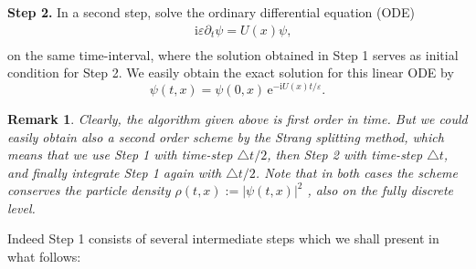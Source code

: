 \documentclass[leqno,final]{siamltex}
\newtheorem{remark}{Remark}[section]
\numberwithin{equation}{section}
\newcounter{me}
\begin{document}
{\par}
\textbf{Step 2.} In a second step, solve the ordinary differential
equation (ODE)
\begin{equation}
\label{bd2}
\begin{aligned}
& \,{\mathrm{i}} {{\varepsilon }} \partial _t\psi  = U(x) \psi, \\
\end{aligned}
\end{equation}
on the same time-interval, where the solution obtained in Step 1
serves as initial condition for Step 2. We easily obtain the exact
solution for this linear ODE by \begin{equation} \label{bd3}
\psi(t,x)=\psi(0,x)\,{\mathrm{e}}^{-{\mathrm{i}} U(x) t/{{\varepsilon }}}. \end{equation}
\begin{remark} \label{rem1}
Clearly, the algorithm given above is first order in time. But we
could easily obtain also a second order scheme by the Strang
splitting method, which means that we use Step 1 with time-step
${\triangle} t/2$, then Step 2 with time-step ${\triangle} t$, and finally
integrate Step 1 again with ${\triangle} t/2$. Note that in both cases the
scheme conserves the particle density $\rho(t,x):= |\psi(t,x)|^2$
, also on the fully discrete level.
\end{remark}
Indeed Step 1 consists of several intermediate steps which we
shall present in what follows:
\end{document}
